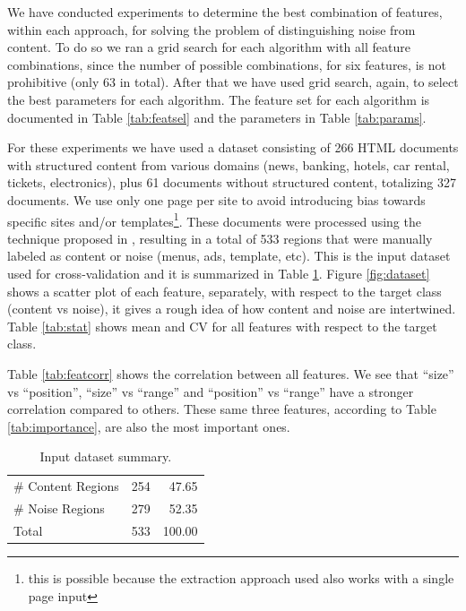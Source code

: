 We have conducted experiments to determine the best combination of features,
within each approach, for solving the problem of distinguishing noise from
content. To do so we ran a grid search for each algorithm with all feature
combinations, since the number of possible combinations, for six features, is
not prohibitive (only 63 in total).
After that we have used grid search, again, to select the best parameters for
each algorithm. The feature set for each algorithm is documented in Table
\ref{tab:featsel} and the parameters in Table \ref{tab:params}.

For these experiments we have used a dataset consisting of 266 HTML documents
with structured content from various domains (news, banking, hotels, car rental,
tickets, electronics), plus 61 documents without structured content, totalizing
327 documents.
We use only one page per site to avoid introducing bias towards specific sites
and/or templates\footnote{this is possible because the extraction approach used
also works with a single page input}. These documents were processed using the
technique proposed in \cite{Velloso:2017:ERW:3132847.3132875}, resulting in a
total of 533 regions that were manually labeled as content or noise (menus, ads,
template, etc). This is the input dataset used for cross-validation and it is
summarized in Table \ref{tab:dataset}. Figure \ref{fig:dataset} shows a scatter
plot of each feature, separately, with respect to the target class (content vs
noise), it gives a rough idea of how content and noise are intertwined. Table
\ref{tab:stat} shows mean and CV for all features with respect to the target
class.

Table \ref{tab:featcorr} shows the correlation between all features. We see that
``size'' vs ``position'', ``size'' vs ``range'' and ``position'' vs ``range''
have a stronger correlation compared to others. These same three features,
according to Table \ref{tab:importance}, are also the most important ones.

 
\begin{table}[h]
\centering
\caption{Input dataset summary.}
\label{tab:dataset}
\begin{tabular}{ | l | l | r |}
\hline
\# Content Regions & 254 & 47.65 \\
\# Noise Regions & 279 & 52.35 \\
\hline
Total & 533 & 100.00 \\
\hline
\end{tabular}
\end{table}

